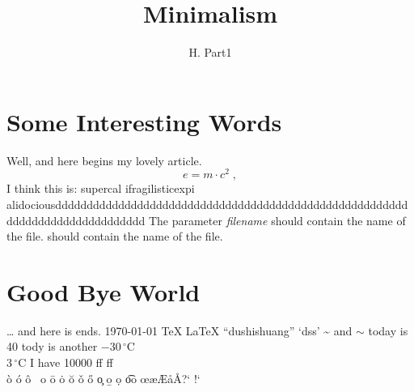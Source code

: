 \documentclass[a4paper, 11pt, titlepage]{article}
\author{H. Part1}
\title{Minimalism}
\begin{document}
\maketitle
\tableofcontents
\section{Some Interesting Words}
Well, and here begins my lovely article.
\begin{equation}
e = m \cdot c^2 \; ,
\end{equation}
I think this is: su\-per\-cal\-%
i\-frag\-i\-lis\-tic\-ex\-pi\-%
al\-i\-do\-ciousdddddddddddddddddddddddddddddddddddddddddddddddddddddd\-dddddddddddddddddddddddd
\newline The parameter
\mbox{\emph{filename}} should contain the name of the file.
 should contain the name of the file.
\section{Good Bye World}
\ldots{} and here is ends.
\today{} 
\TeX{} 
\LaTeX{} 
\LaTeXe{} 
``dushishuang''\newline
`dss'
\~{} and $\sim$
today is 40\textcelsius
tody is another $-30\,^{\circ}\mathrm{C}$\\
$3\,^{\circ}\mathrm{C}$
\newline{}I have 10000\texteuro
ff  f\mbox{}f\\
\`o \'o \^o \ o \=o \.o \u o \v o \H o \c o \b o \d o \t oo \oe \ae \AE \aa \AA ?` !`
\end{document}
